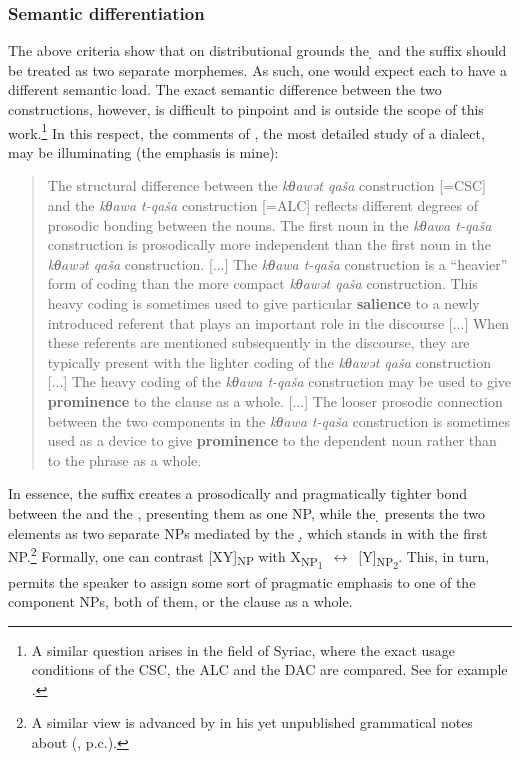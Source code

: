 \subsubsection{Semantic differentiation} \label{ss:sem_diff}

The above criteria show that on distributional grounds the \d {} and the \ed suffix should be treated as two separate morphemes. As such, one would expect each to have a different semantic load. The exact semantic difference between the two constructions, however, is difficult to pinpoint and is outside the scope of this work.\footnote{A similar question arises in the field of Syriac, where the exact usage conditions of the CSC, the ALC and the DAC are compared. See for example \textcites{Meyer}[Ch.\ 2]{WilliamsKings}[Ch.\ 4]{JoostenMatthew}.} In this respect, the comments of \citet[489ff.]{KhanBarwar}, the most detailed study of a  dialect, may be illuminating (the emphasis is mine):

\blockquote{The structural difference between the \textit{kθawət qaša}  construction [=CSC] and the \textit{kθawa t-qaša} construction [=ALC] reflects different degrees of prosodic bonding
between the nouns. The first noun in the \textit{kθawa t-qaša}  construction is
prosodically more independent than the first noun in the \textit{kθawət qaša}
construction. [...] The \textit{kθawa t-qaša} construction is a \enquote{heavier} form of coding than the more
compact \textit{kθawət qaša} construction. This heavy coding is sometimes used
to give particular \textbf{salience} to a newly introduced referent that plays an
important role in the discourse [...] When these referents are mentioned subsequently in the discourse, they
are typically present with the lighter coding of the \textit{kθawət qaša} construction [...] The heavy coding of the \textit{kθawa t-qaša} construction may be used to give
\textbf{prominence} to the clause as a whole. [...] The looser prosodic connection between the two components in the \textit{kθawa t-qaša} construction is sometimes used as a device to give \textbf{prominence} to
the dependent noun rather than to the phrase as a whole.}

In essence, the \ed suffix creates a prosodically and pragmatically tighter bond between the \prim and the \secn, presenting them as one NP, while the \d {} presents the two elements as two separate NPs mediated by the  \d, which stands in  with the first NP.\footnote{A similar view is advanced by  in his yet unpublished grammatical notes about \JZax (, p.c.).} Formally, one can contrast [X\ed Y]\textsubscript{NP} with \mbox{X\textsubscript{NP\textsubscript{1}} $\leftrightarrow$ [\dlnk Y]\textsubscript{NP\textsubscript{2}}}.
 This, in turn, permits the speaker to assign some sort of pragmatic emphasis to one of the component NPs, both of them, or the clause as a whole. 














